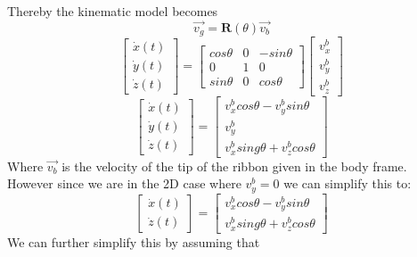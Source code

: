 Thereby the kinematic model becomes
\begin{equation}
    \vec{v_g} = \textbf{R}(\theta) \vec{v_b}
\end{equation}
\begin{equation}
    \begin{bmatrix}
        \dot{x}(t)\\ \dot{y}(t)\\ \dot{z}(t)
    \end{bmatrix} = 
    \begin{bmatrix}
        cos \theta   &   0   &   -sin \theta \\
        0            &   1   &   0\\
        sin \theta   &   0   &   cos \theta
    \end{bmatrix}
    \begin{bmatrix}
        v_x^b \\ v_y^b \\ v_z^b
    \end{bmatrix}
\end{equation}
\begin{equation}
    \begin{bmatrix}
        \dot{x}(t)\\ \dot{y}(t)\\ \dot{z}(t)
    \end{bmatrix} = \begin{bmatrix}
        v_x^bcos \theta - v_y^b sin \theta\\
        v_y^b\\
        v_x^b sing \theta + v_z^b cos \theta
    \end{bmatrix}
\end{equation}
Where \(\vec{v_b}\) is the velocity of the tip of the ribbon given in the body frame. However since we are in the 2D case where \(v_y^b = 0\) we can simplify this to:
\begin{equation}
        \begin{bmatrix}
        \dot{x}(t)\\ \dot{z}(t)
    \end{bmatrix} = \begin{bmatrix}
        v_x^bcos \theta - v_y^b sin \theta\\
        v_x^b sing \theta + v_z^b cos \theta
    \end{bmatrix}
\end{equation}
We can further simplify this by assuming that 


